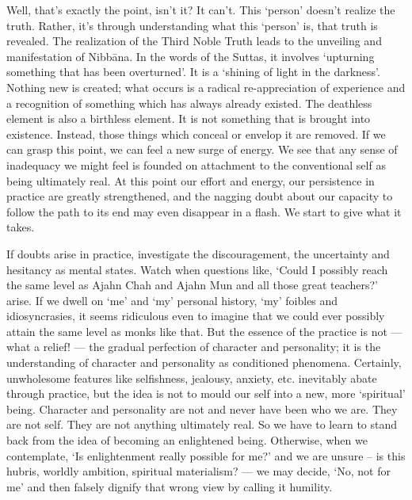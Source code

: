 Well, that's exactly the point, isn't it? It can't. This `person'
doesn't realize the truth. Rather, it's through understanding what this
`person' is, that truth is revealed. The realization of the Third Noble
Truth leads to the unveiling and manifestation of Nibbāna. In the words
of the Suttas, it involves `upturning something that has been
overturned'. It is a `shining of light in the darkness'. Nothing new is
created; what occurs is a radical re-appreciation of experience and a
recognition of something which has always already existed. The deathless
element is also a birthless element. It is not something that is brought
into existence. Instead, those things which conceal or envelop it are
removed. If we can grasp this point, we can feel a new surge of energy.
We see that any sense of inadequacy we might feel is founded on
attachment to the conventional self as being ultimately real. At this
point our effort and energy, our persistence in practice are greatly
strengthened, and the nagging doubt about our capacity to follow the
path to its end may even disappear in a flash. We start to give what it
takes.

If doubts arise in practice, investigate the discouragement, the
uncertainty and hesitancy as mental states. Watch when questions like,
`Could I possibly reach the same level as Ajahn Chah and Ajahn Mun and
all those great teachers?' arise. If we dwell on `me' and `my' personal
history, `my' foibles and idiosyncrasies, it seems ridiculous even to
imagine that we could ever possibly attain the same level as monks like
that. But the essence of the practice is not --- what a relief! --- the
gradual perfection of character and personality; it is the understanding
of character and personality as conditioned phenomena. Certainly,
unwholesome features like selfishness, jealousy, anxiety, etc.
inevitably abate through practice, but the idea is not to mould our self
into a new, more `spiritual' being. Character and personality are not
and never have been who we are. They are not self. They are not anything
ultimately real. So we have to learn to stand back from the idea of
becoming an enlightened being. Otherwise, when we contemplate, `Is
enlightenment really possible for me?' and we are unsure -- is this
hubris, worldly ambition, spiritual materialism? --- we may decide, `No,
not for me' and then falsely dignify that wrong view by calling it
humility.

